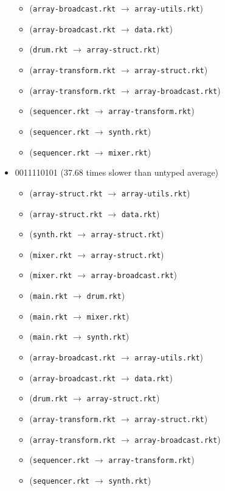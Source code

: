 \documentclass{article}
\newcommand{\mono}[1]{\texttt{#1}}
\begin{document}
\begin{itemize}
\begin{itemize}
  \item (\mono{array-broadcast.rkt} $\rightarrow$ \mono{array-utils.rkt})
  \item (\mono{array-broadcast.rkt} $\rightarrow$ \mono{data.rkt})
  \item (\mono{drum.rkt} $\rightarrow$ \mono{array-struct.rkt})
  \item (\mono{array-transform.rkt} $\rightarrow$ \mono{array-struct.rkt})
  \item (\mono{array-transform.rkt} $\rightarrow$ \mono{array-broadcast.rkt})
  \item (\mono{sequencer.rkt} $\rightarrow$ \mono{array-transform.rkt})
  \item (\mono{sequencer.rkt} $\rightarrow$ \mono{synth.rkt})
  \item (\mono{sequencer.rkt} $\rightarrow$ \mono{mixer.rkt})
  \end{itemize}
\item 0011110101 (37.68 times slower than untyped average)
  \begin{itemize}
  \item (\mono{array-struct.rkt} $\rightarrow$ \mono{array-utils.rkt})
  \item (\mono{array-struct.rkt} $\rightarrow$ \mono{data.rkt})
  \item (\mono{synth.rkt} $\rightarrow$ \mono{array-struct.rkt})
  \item (\mono{mixer.rkt} $\rightarrow$ \mono{array-struct.rkt})
  \item (\mono{mixer.rkt} $\rightarrow$ \mono{array-broadcast.rkt})
  \item (\mono{main.rkt} $\rightarrow$ \mono{drum.rkt})
  \item (\mono{main.rkt} $\rightarrow$ \mono{mixer.rkt})
  \item (\mono{main.rkt} $\rightarrow$ \mono{synth.rkt})
  \item (\mono{array-broadcast.rkt} $\rightarrow$ \mono{array-utils.rkt})
  \item (\mono{array-broadcast.rkt} $\rightarrow$ \mono{data.rkt})
  \item (\mono{drum.rkt} $\rightarrow$ \mono{array-struct.rkt})
  \item (\mono{array-transform.rkt} $\rightarrow$ \mono{array-struct.rkt})
  \item (\mono{array-transform.rkt} $\rightarrow$ \mono{array-broadcast.rkt})
  \item (\mono{sequencer.rkt} $\rightarrow$ \mono{array-transform.rkt})
  \item (\mono{sequencer.rkt} $\rightarrow$ \mono{synth.rkt})

\end{itemize}
\end{itemize}
\end{document}
